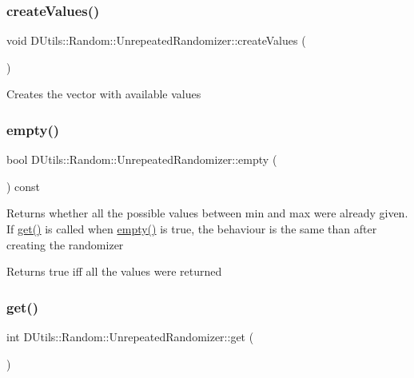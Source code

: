 \subsubsection{\texorpdfstring{create\+Values()}{createValues()}}
{\footnotesize\ttfamily void D\+Utils\+::\+Random\+::\+Unrepeated\+Randomizer\+::create\+Values (\begin{DoxyParamCaption}{ }\end{DoxyParamCaption})\hspace{0.3cm}{\ttfamily [protected]}}

Creates the vector with available values \mbox{\label{classDUtils_1_1Random_1_1UnrepeatedRandomizer_a4f93a3ab99e3e801d0c1d2599917a37a}} 
\subsubsection{\texorpdfstring{empty()}{empty()}}
{\footnotesize\ttfamily bool D\+Utils\+::\+Random\+::\+Unrepeated\+Randomizer\+::empty (\begin{DoxyParamCaption}{ }\end{DoxyParamCaption}) const\hspace{0.3cm}{\ttfamily [inline]}}

Returns whether all the possible values between min and max were already given. If \hyperlink{classDUtils_1_1Random_1_1UnrepeatedRandomizer_ae1bf6a140e322962f65b2c98dc07a3ac}{get()} is called when \hyperlink{classDUtils_1_1Random_1_1UnrepeatedRandomizer_a4f93a3ab99e3e801d0c1d2599917a37a}{empty()} is true, the behaviour is the same than after creating the randomizer \begin{DoxyReturn}{Returns}
true iff all the values were returned 
\end{DoxyReturn}
\mbox{\label{classDUtils_1_1Random_1_1UnrepeatedRandomizer_ae1bf6a140e322962f65b2c98dc07a3ac}} 
\subsubsection{\texorpdfstring{get()}{get()}}
{\footnotesize\ttfamily int D\+Utils\+::\+Random\+::\+Unrepeated\+Randomizer\+::get (\begin{DoxyParamCaption}{ }\end{DoxyParamCaption})}

